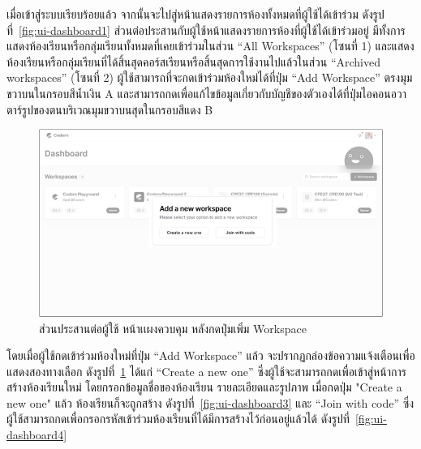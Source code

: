 \documentclass[12pt,one side,openright,a4paper]{cpe-thesis-th}
\newcommand{\thaijustify}[1]{%
  \par\hspace{30pt}\justifying
  #1
}
\begin{document}
\thaijustify{
  เมื่อเข้าสู่ระบบเรียบร้อยแล้ว จากนั้นจะไปสู่หน้าแสดงรายการห้องทั้งหมดที่ผู้ใช้ได้เข้าร่วม ดังรูปที่~\ref{fig:ui-dashboard1} ส่วนต่อประสานกับผู้ใช้หน้าแสดงรายการห้องที่ผู้ใช้ได้เข้าร่วมอยู่ มีทั้งการแสดงห้องเรียนหรือกลุ่มเรียนทั้งหมดที่เคยเข้าร่วมในส่วน “All Workspaces” (โซนที่ 1) และแสดงห้องเรียนหรือกลุ่มเรียนที่ได้สิ้นสุดคอร์สเรียนหรือสิ้นสุดการใช้งานไปแล้วในส่วน “Archived workspaces” (โซนที่ 2) ผู้ใช้สามารถที่จะกดเข้าร่วมห้องใหม่ได้ที่ปุ่ม “Add Workspace” ตรงมุมขวาบนในกรอบสีน้ำเงิน A และสามารถกดเพื่อแก้ไขข้อมูลเกี่ยวกับบัญชีของตัวเองได้ที่ปุ่มไอคอนอวาตาร์รูปของตนบริเวณมุมขวาบนสุดในกรอบสีแดง B

}

\hypertarget{ui-dashboard2}{
  \begin{figure}[H]
    \centering
    \includegraphics[width=15cm]{figure/ui/ui-dashboard2.png}
    \caption[ส่วนประสานต่อผู้ใช้ หน้าแผงควบคุม (กดเพิ่ม Workspace)]{ส่วนประสานต่อผู้ใช้ หน้าเเผงควบคุม หลังกดปุ่มเพิ่ม Workspace}
    \label{fig:ui-dashboard2}
  \end{figure}
}
\thaijustify{
  โดยเมื่อผู้ใช้กดเข้าร่วมห้องใหม่ที่ปุ่ม “Add Workspace” แล้ว จะปรากฏกล่องข้อความแจ้งเตือนเพื่อแสดงสองทางเลือก ดังรูปที่~\ref{fig:ui-dashboard2} ได้แก่ “Create a new one” ซึ่งผู้ใช้จะสามารถกดเพื่อเข้าสู่หน้าการสร้างห้องเรียนใหม่ โดยกรอกข้อมูลชื่อของห้องเรียน รายละเอียดและรูปภาพ เมื่อกดปุ่ม "Create a new one" แล้ว ห้องเรียนก็จะถูกสร้าง ดังรูปที่~\ref{fig:ui-dashboard3} และ “Join with code” ซึ่งผู้ใช้สามารถกดเพื่อกรอกรหัสเข้าร่วมห้องเรียนที่ได้มีการสร้างไว้ก่อนอยู่แล้วได้ ดังรูปที่~\ref{fig:ui-dashboard4}
}
\end{document}
